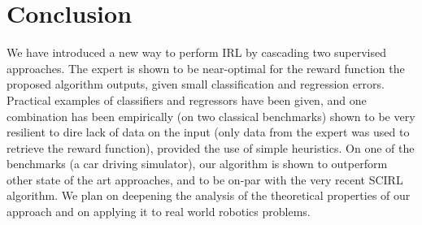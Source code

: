 \documentclass[smallextended]{svjour3}
\begin{document}
\section{Conclusion}
\label{sec:conclusion}
We have introduced a new way to perform IRL by cascading two supervised approaches. The expert is shown to be near-optimal for the reward function the proposed algorithm outputs, given small classification and regression errors. Practical examples of classifiers and regressors have been given, and one combination has been empirically (on two classical benchmarks) shown to be very resilient to dire lack of data on the input (only data from the expert was used to retrieve the reward function), provided the use of simple heuristics. On one of the benchmarks (a car driving simulator), our algorithm is shown to outperform other state of the art approaches, and to be on-par with the very recent SCIRL algorithm. We plan on deepening the analysis of the theoretical properties of our approach and on applying it to real world robotics problems.



\end{document}
